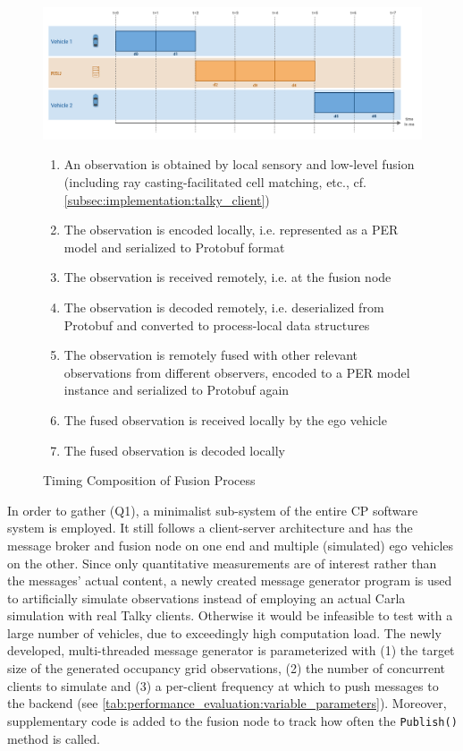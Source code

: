 \begin{figure}[h]
	\centering
	\includegraphics[width=1\linewidth]{98_images/communication_timeline}
	\caption{Timing Composition of Fusion Process}
	\label{fig:communication_timeline}
	\medskip
	\small
	\begin{enumerate}[t = 1:\ ]
		\item An observation is obtained by local sensory and low-level fusion (including ray casting-facilitated cell matching, etc., cf. \cref{subsec:implementation:talky_client}) \\
		\item The observation is encoded locally, i.e. represented as a PER model and serialized to Protobuf format
		\item The observation is received remotely, i.e. at the fusion node
		\item The observation is decoded remotely, i.e. deserialized from Protobuf and converted to process-local data structures
		\item The observation is remotely fused with other relevant observations from different observers, encoded to a PER model instance and serialized to Protobuf again
		\item The fused observation is received locally by the ego vehicle
		\item The fused observation is decoded locally
	\end{enumerate}
\end{figure}

In order to gather (Q1), a minimalist sub-system of the entire CP software system is employed. It still follows a client-server architecture and has the message broker and fusion node on one end and multiple (simulated) ego vehicles on the other. Since only quantitative measurements are of interest rather than the messages' actual content, a newly created message generator program is used to artificially simulate observations instead of employing an actual Carla simulation with real Talky clients. Otherwise it would be infeasible to test with a large number of vehicles, due to exceedingly high computation load. The newly developed, multi-threaded message generator is parameterized with (1) the target size of the generated occupancy grid observations, (2) the number of concurrent clients to simulate and (3) a per-client frequency at which to push messages to the backend (see \cref{tab:performance_evaluation:variable_parameters}). Moreover, supplementary code is added to the fusion node to track how often the \texttt{Publish()} method is called.


